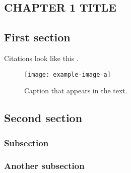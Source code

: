 \documentclass[crop=false,12pt,class=report]{standalone}
\begin{document}
\begin{refsection}
\begin{doublespacing}

\chapter[CHAPTER 1 TITLE]{CHAPTER 1 TITLE\protect\footnotemark}


\section{First section}
\lipsum[1-4]

Citations look like this \cite{hanahan2011hallmarks,jain2001normalizing}.

\begin{figure}
    \centering
    \texttt{[image: example-image-a]}
    \caption[Caption that appears in the table of contents.]{Caption that appears in the text.}
    \label{ch1_fig1}
\end{figure}

\section{Second section}
\subsection{Subsection}
\lipsum[5-8]
\subsection{Another subsection}
\lipsum[9-10]

\newpage
\begin{singlespace}
{
\titlespacing{\chapter}{0pt}{0in}{12pt}
\printbibliography[title=REFERENCES,heading=bibintoc]
}
\end{singlespace}

\end{doublespacing}
\end{refsection}
\end{document}
